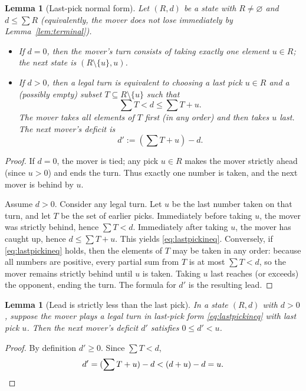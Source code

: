 \documentclass[11pt]{article}
\newtheorem{lemma}[theorem]{Lemma}
\begin{document}
\begin{lemma}[Last-pick normal form]\label{lem:last-pick}
Let $(R,d)$ be a state with $R\neq\varnothing$ and $d\le \sum R$ (equivalently, the mover does not lose immediately by Lemma~\ref{lem:terminal}).
\begin{itemize}
\item If $d=0$, then the mover's turn consists of taking \emph{exactly one} element $u\in R$; the next state is $(R\setminus\{u\},u)$.
\item If $d>0$, then a legal turn is equivalent to choosing a last pick $u\in R$ and a (possibly empty) subset
$T\subseteq R\setminus\{u\}$ such that
\begin{equation}\label{eq:lastpickineq}
\sum T < d \le \sum T + u.
\end{equation}
The mover takes all elements of $T$ first (in any order) and then takes $u$ last. The next mover's deficit is
\[
d' := (\sum T + u)-d.
\]
\end{itemize}
\end{lemma}

\begin{proof}
If $d=0$, the mover is tied; any pick $u\in R$ makes the mover strictly ahead (since $u>0$) and ends the turn.
Thus exactly one number is taken, and the next mover is behind by $u$.

Assume $d>0$. Consider any legal turn. Let $u$ be the last number taken on that turn, and let $T$ be the set of earlier picks.
Immediately before taking $u$, the mover was strictly behind, hence $\sum T<d$.
Immediately after taking $u$, the mover has caught up, hence $d\le \sum T+u$.
This yields \eqref{eq:lastpickineq}. Conversely, if \eqref{eq:lastpickineq} holds, then the elements of $T$ may be taken in any order: because all numbers are positive,
every partial sum from $T$ is at most $\sum T<d$, so the mover remains strictly behind until $u$ is taken.
Taking $u$ last reaches (or exceeds) the opponent, ending the turn. The formula for $d'$ is the resulting lead.
\end{proof}

\begin{lemma}[Lead is strictly less than the last pick]\label{lem:lead<last}
In a state $(R,d)$ with $d>0$, suppose the mover plays a legal turn in last-pick form \eqref{eq:lastpickineq} with last pick $u$.
Then the next mover's deficit $d'$ satisfies $0\le d'<u$.
\end{lemma}

\begin{proof}
By definition $d'\ge 0$. Since $\sum T<d$,
\[
d'=(\sum T+u)-d < (d+u)-d=u.\qedhere
\]
\end{proof}
\end{document}
